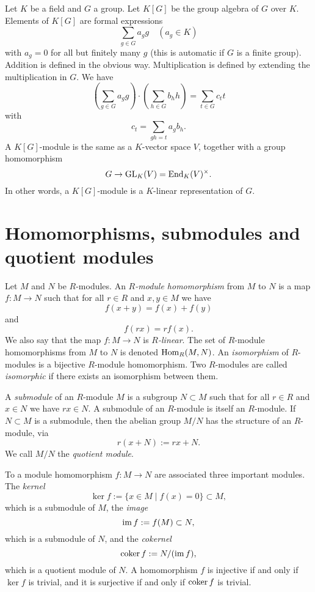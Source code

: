 \begin{example}\label{exa:group-algebra}
Let $K$ be a field and $G$ a group. Let $K[G]$ be the group algebra of $G$ over $K$. Elements of $K[G]$ are formal expressions 
\[
	\sum_{g\in G} a_g g \quad (a_g \in K)
\]
with $a_g=0$ for all but  finitely many $g$ (this is automatic if $G$ is a finite group).
Addition is defined in the obvious way. Multiplication is defined by extending the multiplication in $G$. We have
\[
	\left(\sum_{g\in G} a_g g \right) \cdot \left(\sum_{h\in G} b_h h \right)
	= \sum_{t \in G} c_t t
\]
with
\[
	c_t = \sum_{gh=t} a_gb_h.
\]
A $K[G]$-module is the same as a $K$-vector space $V$, together with a group homomorphism
\[
	G \to \operatorname{GL}_K(V) = \operatorname{\mathrm{End}}_K(V)^\times.
\]
In other words, a $K[G]$-module is a $K$-linear representation of $G$.
\end{example}


\section{Homomorphisms, submodules and quotient modules}

\begin{definition} Let $M$ and $N$ be $R$-modules. An \emph{$R$-module homomorphism} from $M$ to $N$ is a map $f\colon M\to N$ such that for all $r\in R$ and $x,y\in M$ we have
\[
	f(x+y)=f(x)+f(y)
\]
and
\[
	f(rx) = r f(x).
\]
We also say that the map $f\colon M\to N$ is \emph{$R$-linear}. The set of $R$-module homomorphisms from $M$ to $N$ is denoted $\operatorname{Hom}_R(M,N)$. An \emph{isomorphism} of $R$-modules is a bijective $R$-module homomorphism. Two $R$-modules are called \emph{isomorphic} if there exists an  isomorphism between them.
\end{definition}




A \emph{submodule} of an $R$-module $M$ is a subgroup $N\subset M$ such that for all $r\in R$ and $x\in N$ we have $rx\in N$. A submodule of an $R$-module is itself an $R$-module. If $N\subset M$ is a submodule, then the abelian group $M/N$ has the structure of an $R$-module, via
\[
	r(x+N) := rx + N.
\]
We call $M/N$ the \emph{quotient module}.

To a module homomorphism $f\colon M \to N$ are associated three important modules. The \emph{kernel}
\[
	\ker f := \{ x\in M \mid f(x)=0 \} \subset M,
\]
which is a submodule of $M$, the \emph{image}
\[
	\operatorname{im} f := f(M) \subset N,
\]
which is a submodule of $N$, and the \emph{cokernel}
\[
	\operatorname{coker} f := N/(\operatorname{im} f),
\]
which is a quotient module of $N$. A homomorphism $f$ is injective if and only if $\ker f$ is trivial, and it is surjective if and only if $\operatorname{coker} f$ is trivial.

